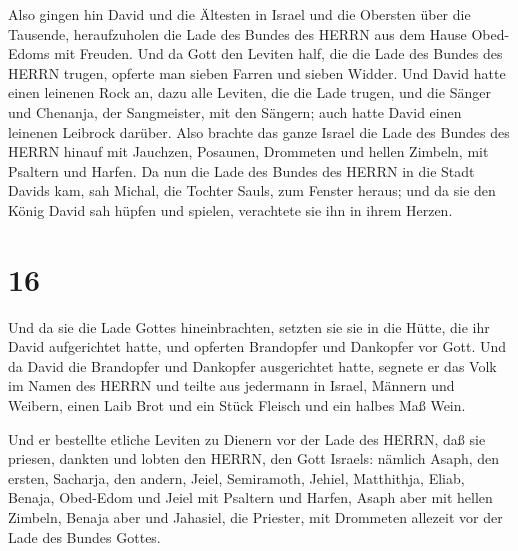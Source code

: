  Also gingen hin David und die Ältesten in Israel und die
Obersten über die Tausende, heraufzuholen die Lade des Bundes des HERRN
aus dem Hause Obed-Edoms mit Freuden.  Und da Gott den
Leviten half, die die Lade des Bundes des HERRN trugen, opferte man
sieben Farren und sieben Widder.  Und David hatte einen
leinenen Rock an, dazu alle Leviten, die die Lade trugen, und die Sänger
und Chenanja, der Sangmeister, mit den Sängern; auch hatte David einen
leinenen Leibrock darüber.  Also brachte das ganze Israel
die Lade des Bundes des HERRN hinauf mit Jauchzen, Posaunen, Drommeten
und hellen Zimbeln, mit Psaltern und Harfen.  Da nun die
Lade des Bundes des HERRN in die Stadt Davids kam, sah Michal, die
Tochter Sauls, zum Fenster heraus; und da sie den König David sah hüpfen
und spielen, verachtete sie ihn in ihrem Herzen.

\hypertarget{section-15}{%
\section{16}\label{section-15}}

 Und da sie die Lade Gottes hineinbrachten, setzten sie sie
in die Hütte, die ihr David aufgerichtet hatte, und opferten Brandopfer
und Dankopfer vor Gott.  Und da David die Brandopfer und
Dankopfer ausgerichtet hatte, segnete er das Volk im Namen des HERRN
 und teilte aus jedermann in Israel, Männern und Weibern,
einen Laib Brot und ein Stück Fleisch und ein halbes Maß Wein.

 Und er bestellte etliche Leviten zu Dienern vor der Lade
des HERRN, daß sie priesen, dankten und lobten den HERRN, den Gott
Israels:  nämlich Asaph, den ersten, Sacharja, den andern,
Jeiel, Semiramoth, Jehiel, Matthithja, Eliab, Benaja, Obed-Edom und
Jeiel mit Psaltern und Harfen, Asaph aber mit hellen Zimbeln,
 Benaja aber und Jahasiel, die Priester, mit Drommeten
allezeit vor der Lade des Bundes Gottes.

